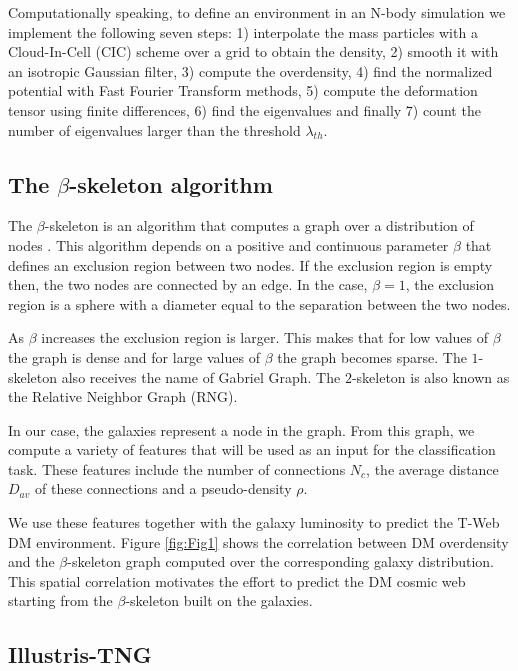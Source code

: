 \documentclass[usenatbib]{mnras}
\begin{document}
Computationally speaking, to define an environment in an N-body simulation 
we implement the following seven steps: 1) interpolate the mass particles with a Cloud-In-Cell
(CIC) scheme over a grid to obtain the density, 2) smooth it with an isotropic Gaussian filter,
3) compute the overdensity, 4) find the normalized potential with Fast Fourier Transform
methods, 5) compute the deformation tensor using finite differences, 6) find the eigenvalues and
finally 7) count the number of eigenvalues larger than the threshold $\lambda_{th}$.

\subsection{The $\beta$-skeleton algorithm}
The $\beta$-skeleton is an algorithm that computes a graph over a distribution of nodes
\citep{1985Kirkpatrick, 2019Fang}. 
This algorithm depends on a positive and continuous parameter $\beta$ that defines an exclusion
region between two nodes.
If the exclusion region is empty then, the two nodes are connected by an edge. 
In the case, $\beta=1$, the exclusion region is a sphere with a diameter equal to the separation
between the two nodes. 

As $\beta$ increases the exclusion region is larger.
This makes that for low values of $\beta$ the graph is dense and for large values of $\beta$
the graph becomes sparse.
The $1$-skeleton also receives the name of Gabriel Graph. 
The $2$-skeleton is also known as the Relative Neighbor Graph (RNG).

In our case, the galaxies represent a node in the graph.
From this graph, we compute a variety of features that will be used as an input
for the classification task.
These features include the number of connections $N_{c}$, the average distance $D_{av}$ of these connections and a pseudo-density $\rho$.

We use these features together with the galaxy luminosity to predict the T-Web DM environment.
Figure \ref{fig:Fig1} shows the correlation between DM overdensity and the $\beta$-skeleton 
graph computed over the corresponding galaxy distribution.
This spatial correlation motivates the effort to predict the DM cosmic web starting from
the $\beta$-skeleton built on the galaxies.

\subsection{Illustris-TNG}
\end{document}
